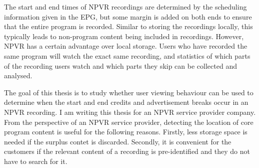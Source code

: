 The start and end times of NPVR recordings are determined by the scheduling information given in the EPG, but some margin is added on both ends to ensure that the entire program is recorded. Similar to storing the recordings locally, this typically leads to non-program content being included in recordings. However, NPVR has a certain advantage over local storage. Users who have recorded the same program will watch the exact same recording, and statistics of which parts of the recording users watch and which parts they skip can be collected and analysed.

The goal of this thesis is to study whether user viewing behaviour can be used to determine when the start and end credits and advertisement breaks occur in an NPVR recording.
I am writing this thesis for an NPVR service provider company. From the perspective of an NPVR service provider, detecting the location of core program content is useful for the following reasons. Firstly, less storage space is needed if the surplus contet is discarded. Secondly, it is convenient for the customers if the relevant content of a recording is pre-identified and they do not have to search for it.


